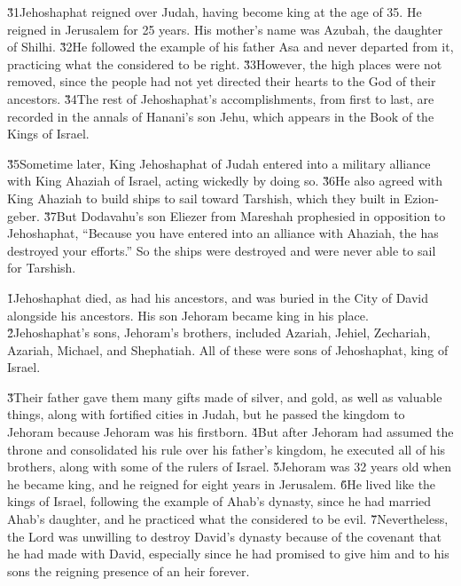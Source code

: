 \v{31}Jehoshaphat reigned over Judah, having become king at the age of 35. He reigned in Jerusalem for 25 years. His mother's name was Azubah, the daughter of Shilhi. \v{32}He followed the example of his father Asa and never departed from it, practicing what the  considered to be right. \v{33}However, the high places were not removed, since the people had not yet directed their hearts to the God of their ancestors. \v{34}The rest of Jehoshaphat's accomplishments, from first to last, are recorded in the annals of Hanani's son Jehu, which appears in the Book of the Kings of Israel.

\v{35}Sometime later, King Jehoshaphat of Judah entered into a military alliance with King Ahaziah of Israel, acting wickedly by doing so. \v{36}He also agreed with King Ahaziah to build ships to sail toward Tarshish, which they built in Ezion-geber. \v{37}But Dodavahu's son Eliezer from Mareshah prophesied in opposition to Jehoshaphat, ``Because you have entered into an alliance with Ahaziah, the  has destroyed your efforts.'' So the ships were destroyed and were never able to sail for Tarshish.

\v{1}Jehoshaphat died, as had his ancestors, and was buried in the City of David alongside his ancestors. His son Jehoram became king in his place. \v{2}Jehoshaphat's sons, Jehoram's brothers, included Azariah, Jehiel, Zechariah, Azariah, Michael, and Shephatiah. All of these were sons of Jehoshaphat, king of Israel.

\v{3}Their father gave them many gifts made of silver, and gold, as well as valuable things, along with fortified cities in Judah, but he passed the kingdom to Jehoram because Jehoram was his firstborn. \v{4}But after Jehoram had assumed the throne and consolidated his rule over his father's kingdom, he executed all of his brothers, along with some of the rulers of Israel. \v{5}Jehoram was 32 years old when he became king, and he reigned for eight years in Jerusalem. \v{6}He lived like the kings of Israel, following the example of Ahab's dynasty, since he had married Ahab's daughter, and he practiced what the  considered to be evil. \v{7}Nevertheless, the Lord was unwilling to destroy David's dynasty because of the covenant that he had made with David, especially since he had promised to give him and to his sons the reigning presence of an heir forever.

